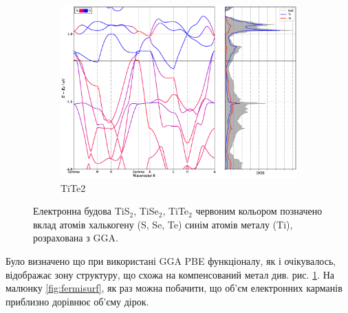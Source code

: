 \begin{figure}[H]
\begin{subfigure}[b]{.4\textwidth}
    	\includegraphics[width=\linewidth]{img/results/TiTe2_GGA_relaxed_BAND+DOS.eps}
    	\caption{
    	TiTe2}
	\end{subfigure}
\caption{Електронна будова TiS$_2$, TiSe$_2$, TiTe$_2$ червоним кольором позначено вклад атомів халькогену (S, Se, Te) синім атомів металу (Ti), розрахована з GGA.}
\label{fig:bandstructireGGA}
\end{figure}

Було визначено що при використані GGA PBE функціоналу, як і очікувалось, відображає зону структуру, що схожа на компенсований метал див. рис. \ref{fig:bandstructireGGA}. На малюнку \ref{fig:fermisurf}, як раз можна побачити, що об'єм електронних карманів приблизно дорівнює об'єму дірок.

